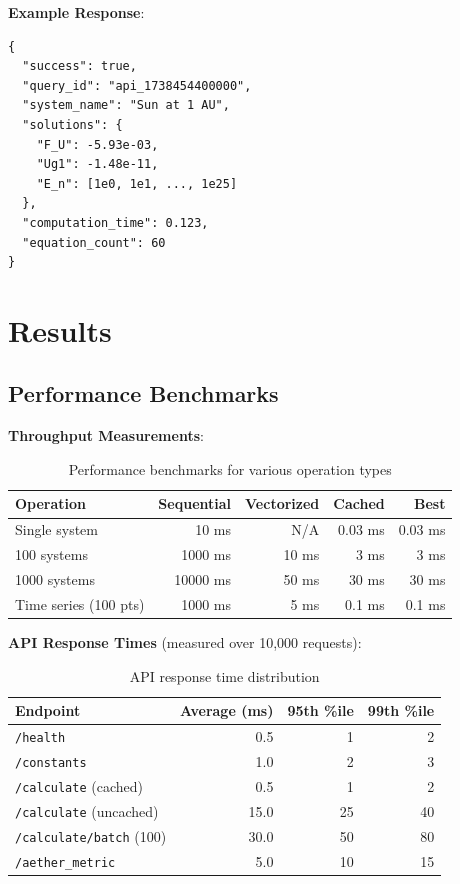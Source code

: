 \documentclass[12pt,a4paper]{article}
\begin{document}
\textbf{Example Response}:
\begin{verbatim}
{
  "success": true,
  "query_id": "api_1738454400000",
  "system_name": "Sun at 1 AU",
  "solutions": {
    "F_U": -5.93e-03,
    "Ug1": -1.48e-11,
    "E_n": [1e0, 1e1, ..., 1e25]
  },
  "computation_time": 0.123,
  "equation_count": 60
}
\end{verbatim}

\section{Results}

\subsection{Performance Benchmarks}

\textbf{Throughput Measurements}:

\begin{table}[H]
\centering
\begin{tabular}{@{}lrrrr@{}}
\toprule
\textbf{Operation} & \textbf{Sequential} & \textbf{Vectorized} & \textbf{Cached} & \textbf{Best} \\
\midrule
Single system & 10 ms & N/A & 0.03 ms & 0.03 ms \\
100 systems & 1000 ms & 10 ms & 3 ms & 3 ms \\
1000 systems & 10000 ms & 50 ms & 30 ms & 30 ms \\
Time series (100 pts) & 1000 ms & 5 ms & 0.1 ms & 0.1 ms \\
\bottomrule
\end{tabular}
\caption{Performance benchmarks for various operation types}
\label{tab:performance}
\end{table}

\textbf{API Response Times} (measured over 10,000 requests):

\begin{table}[H]
\centering
\begin{tabular}{@{}lrrr@{}}
\toprule
\textbf{Endpoint} & \textbf{Average (ms)} & \textbf{95th \%ile} & \textbf{99th \%ile} \\
\midrule
\texttt{/health} & 0.5 & 1 & 2 \\
\texttt{/constants} & 1.0 & 2 & 3 \\
\texttt{/calculate} (cached) & 0.5 & 1 & 2 \\
\texttt{/calculate} (uncached) & 15.0 & 25 & 40 \\
\texttt{/calculate/batch} (100) & 30.0 & 50 & 80 \\
\texttt{/aether\_metric} & 5.0 & 10 & 15 \\
\bottomrule
\end{tabular}
\caption{API response time distribution}
\label{tab:api_response}
\end{table}
\end{document}
